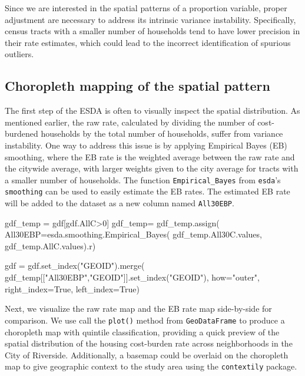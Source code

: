 \documentclass[
]{aft}
\newenvironment{Shaded}{\begin{snugshade}}{\end{snugshade}}
\newcommand{\DecValTok}[1]{\textcolor[rgb]{0.68,0.00,0.00}{#1}}
\newcommand{\NormalTok}[1]{\textcolor[rgb]{0.00,0.23,0.31}{#1}}
\newcommand{\OperatorTok}[1]{\textcolor[rgb]{0.37,0.37,0.37}{#1}}
\newcommand{\StringTok}[1]{\textcolor[rgb]{0.13,0.47,0.30}{#1}}
\newcommand{\VariableTok}[1]{\textcolor[rgb]{0.07,0.07,0.07}{#1}}
\begin{document}
Since we are interested in the spatial patterns of a proportion
variable, proper adjustment are necessary to address its intrinsic
variance instability. Specifically, census tracts with a smaller number
of households tend to have lower precision in their rate estimates,
which could lead to the incorrect identification of spurious outliers.

\subsection{Choropleth mapping of the spatial
pattern}\label{choropleth-mapping-of-the-spatial-pattern}

The first step of the ESDA is often to visually inspect the spatial
distribution. As mentioned earlier, the raw rate, calculated by dividing
the number of cost-burdened households by the total number of
households, suffer from variance instability. One way to address this
issue is by applying Empirical Bayes (EB) smoothing, where the EB rate
is the weighted average between the raw rate and the citywide average,
with larger weights given to the city average for tracts with a smaller
number of households. The function \texttt{Empirical\_Bayes} from
\texttt{esda}'s \texttt{smoothing} can be used to easily estimate the EB
rates. The estimated EB rate will be added to the dataset as a new
column named \texttt{All30EBP}.

\begin{Shaded}
\begin{Highlighting}[]
\NormalTok{gdf\_temp }\OperatorTok{=}\NormalTok{ gdf[gdf.AllC}\OperatorTok{\textgreater{}}\DecValTok{0}\NormalTok{]}
\NormalTok{gdf\_temp}\OperatorTok{=}\NormalTok{ gdf\_temp.assign(}
\NormalTok{  All30EBP}\OperatorTok{=}\NormalTok{esda.smoothing.Empirical\_Bayes(}
\NormalTok{    gdf\_temp.All30C.values, }
\NormalTok{    gdf\_temp.AllC.values).r)}

\NormalTok{gdf }\OperatorTok{=}\NormalTok{ gdf.set\_index(}\StringTok{"GEOID"}\NormalTok{).merge(}
\NormalTok{  gdf\_temp[[}\StringTok{"All30EBP"}\NormalTok{,}\StringTok{"GEOID"}\NormalTok{]].set\_index(}\StringTok{"GEOID"}\NormalTok{),}
\NormalTok{  how}\OperatorTok{=}\StringTok{"outer"}\NormalTok{, }
\NormalTok{  right\_index}\OperatorTok{=}\VariableTok{True}\NormalTok{, }
\NormalTok{  left\_index}\OperatorTok{=}\VariableTok{True}\NormalTok{)}
\end{Highlighting}
\end{Shaded}

Next, we visualize the raw rate map and the EB rate map side-by-side for
comparison. We use call the \texttt{plot()} method from
\texttt{GeoDataFrame} to produce a choropleth map with quintile
classification, providing a quick preview of the spatial distribution of
the housing cost-burden rate across neighborhoods in the City of
Riverside. Additionally, a basemap could be overlaid on the choropleth
map to give geographic context to the study area using the
\texttt{contextily} package.
\end{document}
